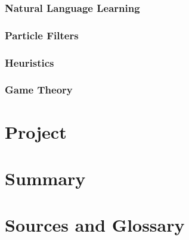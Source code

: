 \subsection{Natural Language Learning}
\subsection{Particle Filters}
\subsection{Heuristics}
\subsection{Game Theory}

\chapter{Project}



\chapter{Summary}

\onecolumn
\chapter{Sources and Glossary}

